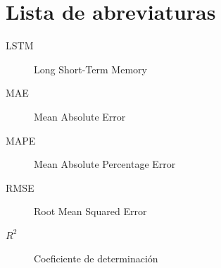 \chapter*{Lista de abreviaturas}

\begin{description}
  \item[LSTM] Long Short-Term Memory
  \item[MAE] Mean Absolute Error
  \item[MAPE] Mean Absolute Percentage Error
  \item[RMSE] Root Mean Squared Error
  \item[$R^2$] Coeficiente de determinación
\end{description}
